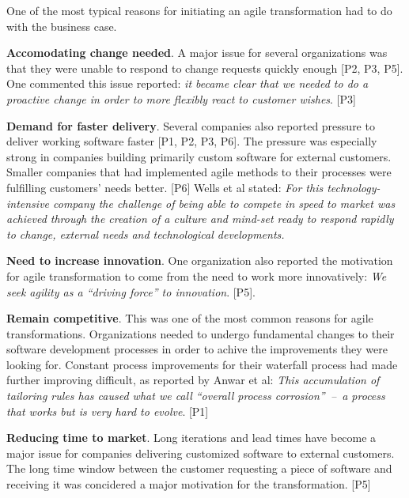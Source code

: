 One of the most typical reasons for initiating an agile transformation
had to do with the business case.

{\bfseries Accomodating change needed}. A major issue for
several organizations was that they were unable to respond to change
requests quickly enough [P2, P3, P5]. One commented this issue reported: \textit{it became clear
that we needed to do a proactive change in order to more flexibly react
to customer wishes}. [P3]

{\bfseries Demand for faster delivery}. Several companies also reported
pressure to deliver working software faster [P1, P2, P3, P6]. The
pressure was especially strong in companies building primarily custom
software for external customers. Smaller companies that had implemented
agile methods to their processes were fulfilling customers' needs
better. [P6] Wells et al stated: \textit{For this technology{-}intensive
company the challenge of being able to compete in speed to market was
achieved through the creation of a culture and mind-set ready to respond
rapidly to change, external needs and technological developments.}

{\bfseries Need to increase innovation}. One organization also reported
the motivation for agile transformation to come from the need to work
more innovatively: \textit{We seek agility as a ``driving force'' to
innovation}. [P5].

{\bfseries Remain competitive}. This was one of the most common reasons for
agile transformations. Organizations needed to undergo fundamental changes to
their software development processes in order to achive the improvements they
were looking for. Constant process improvements for their waterfall process had
made further improving difficult, as reported by Anwar et al: \textit{This
accumulation of tailoring rules has caused what we call ``overall process
corrosion'' – a process that works but is very hard to evolve}. [P1]

{\bfseries Reducing time to market}. Long iterations and lead times have become
a major issue for companies delivering customized software to external
customers. The long time window between the customer requesting a piece of
software and receiving it was concidered a major motivation for the
transformation. [P5]
